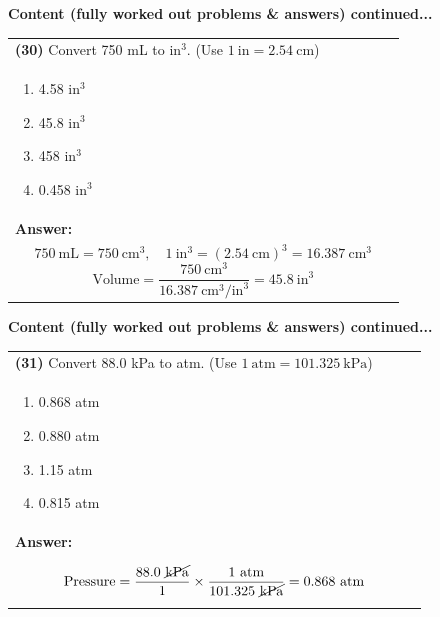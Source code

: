 \documentclass{article}
\begin{document}
{\newpage
\noindent
{\large\textbf{Content (fully worked out problems \& answers) continued...}}\\[0.2em]
\vspace{0.2cm}
\begin{tabular}{|p{0.9\linewidth}|}
\hline
\vspace{0.2cm}
\textbf{(30)} Convert 750 mL to $\text{in}^3$. (Use $1~\text{in}=2.54~\text{cm}$)\\
\begin{minipage}[t]{0.85\linewidth}
\begin{enumerate}[label=\alph*.]
   \item 4.58 $\text{in}^3$ \
   \item 45.8 $\text{in}^3$ \
   \item 458 $\text{in}^3$ \
   \item 0.458 $\text{in}^3$
\end{enumerate}
\end{minipage}\\
\hline
\vspace{0.2cm}
\textbf{Answer:}\\
\[
750~\text{mL}=750~\text{cm}^3,\quad 1~\text{in}^3=(2.54~\text{cm})^3=16.387~\text{cm}^3
\]
\[
\text{Volume}=\frac{750~\text{cm}^3}{16.387~\text{cm}^3/\text{in}^3}=45.8~\text{in}^3
\] \\
\hline
\end{tabular}

\newpage
\noindent
{\large\textbf{Content (fully worked out problems \& answers) continued...}}\\[0.2em]
\vspace{0.2cm}
\begin{tabular}{|p{0.9\linewidth}|}
\hline
\vspace{0.2cm}
\textbf{(31)} Convert 88.0 kPa to atm. (Use $1~\text{atm}=101.325~\text{kPa}$)\\
\begin{minipage}[t]{0.85\linewidth}
\begin{enumerate}[label=\alph*.]
   \item 0.868 atm \
   \item 0.880 atm \
   \item 1.15 atm \
   \item 0.815 atm
\end{enumerate}
\end{minipage}\\
\hline
\vspace{0.2cm}
\textbf{Answer:}\\
\[
\text{Pressure}=\frac{88.0~\cancel{\text{kPa}}}{1}\times\frac{1~\text{atm}}{101.325~\cancel{\text{kPa}}}=0.868~\text{atm}
\] \\
\hline
\end{tabular}

}
\end{document}
